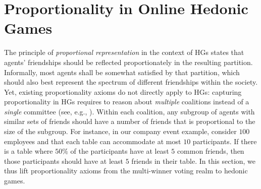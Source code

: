 \documentclass[letterpaper]{article} %
\begin{document}
\section{Proportionality in Online Hedonic Games}
\label{sec:Proportionality Axioms in OASHGs}
The principle of \textit{proportional representation} in the context of HGs states that agents’ friendships should be reflected proportionately in the resulting partition. Informally, most agents shall be somewhat satisfied by that partition, which should also best represent the spectrum of different friendships within the society. Yet, existing proportionality axioms do not directly apply to HGs: capturing proportionality in HGs requires to reason about \textit{multiple} coalitions instead of a \textit{single} committee (see, e.g., \cite{aziz2017justified}). Within each coalition, any subgroup of agents with similar sets of friends should have a number of friends that is proportional to the size of the subgroup. For instance, in our company event example, consider $100$ employees and that each table can accommodate at most $10$ participants. If there is a table where $50\%$ of the participants have at least $5$ common friends, then those participants should have at least $5$ friends in their table. In this section, we thus lift proportionality axioms from the multi-winner voting realm to hedonic games.
%

%
\end{document}
